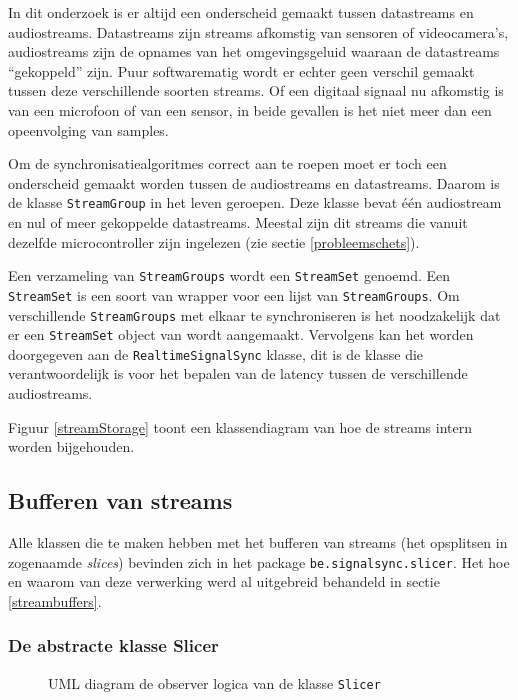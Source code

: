 In dit onderzoek is er altijd een onderscheid gemaakt tussen datastreams en audiostreams. Datastreams zijn streams afkomstig van sensoren of videocamera's, audiostreams zijn de opnames van het omgevingsgeluid waaraan de datastreams ``gekoppeld'' zijn. Puur softwarematig wordt er echter geen verschil gemaakt tussen deze verschillende soorten streams. Of een digitaal signaal nu afkomstig is van een microfoon of van een sensor, in beide gevallen is het niet meer dan een opeenvolging van samples.

Om de synchronisatiealgoritmes correct aan te roepen moet er toch een onderscheid gemaakt worden tussen de audiostreams en datastreams. Daarom is de klasse \texttt{StreamGroup} in het leven geroepen. Deze klasse bevat één audiostream en nul of meer gekoppelde datastreams. Meestal zijn dit streams die vanuit dezelfde microcontroller zijn ingelezen (zie sectie \ref{probleemschets}).

Een verzameling van \texttt{StreamGroups} wordt een \texttt{StreamSet} genoemd. Een \texttt{StreamSet} is een soort van wrapper voor een lijst van \texttt{StreamGroups}. Om verschillende \texttt{StreamGroups} met elkaar te synchroniseren is het noodzakelijk dat er een \texttt{StreamSet} object van wordt aangemaakt. Vervolgens kan het worden doorgegeven aan de  \texttt{RealtimeSignalSync} klasse, dit is de klasse die verantwoordelijk is voor het bepalen van de latency tussen de verschillende audiostreams. 

Figuur \ref{streamStorage} toont een klassendiagram van hoe de streams intern worden bijgehouden.

\subsection{Bufferen van streams}

Alle klassen die te maken hebben met het bufferen van streams (het opsplitsen in zogenaamde \textit{slices}) bevinden zich in het package \texttt{be.signalsync.slicer}. Het hoe en waarom van deze verwerking werd al uitgebreid behandeld in sectie \ref{streambuffers}.

\subsubsection{De abstracte klasse Slicer}

\begin{figure}[h!]
	\captionsetup{width=0.7\textwidth}
	\caption{UML diagram de observer logica van de klasse \texttt{Slicer}}
	\begin{center}
		\advance\parskip0.3cm
		
	\end{center}
	\label{slicerObserver}
\end{figure}

